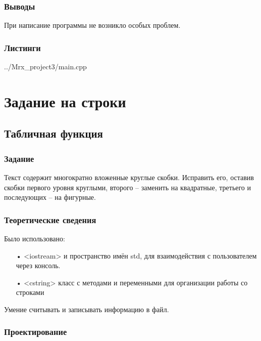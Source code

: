 \documentclass[12pt,a4paper]{report}
\begin{document}
\subsection{Выводы}

При написание программы не возникло особых проблем.

\subsection*{Листинги}


{../Mrx_project3/main.cpp}


\chapter{Задание на строки}

\section{Табличная функция}

\subsection{Задание}

Текст содержит многократно вложенные круглые скобки. Исправить его, оставив скобки первого уровня круглыми, второго – заменить на квадратные, третьего и последующих – на фигурные.

\subsection{Теоретические сведения}

Было использовано:
\begin{enumerate}
\item[•] <iostream> и пространство имён std, для взаимодействия с пользователем через консоль.
\item[•] <cstring> класс с методами и переменными для организации работы со строками
\end{enumerate}


Умение считывать и записывать информацию в файл. 

\subsection{Проектирование}
\end{document}
